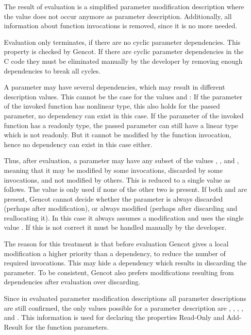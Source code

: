 The result of evaluation is a simplified parameter modification description where the value  does not 
occur anymore as parameter description. Additionally, all information about function invocations is removed, since it is
no more needed.

Evaluation only terminates, if there are no cyclic parameter dependencies. This property is checked by Gencot. If there
are cyclic parameter dependencies in the C code they must be eliminated manually by the developer by removing enough dependencies 
to break all cycles.

A parameter may have several dependencies, which may result in different description values. This cannot be the case for
the values  and : If the parameter of the invoked function has nonlinear type, this
also holds for the passed parameter, no dependency can exist in this case. If the parameter of the invoked function has
a readonly type, the passed parameter can still have a linear type which is not readonly. But it cannot be modified by the
function invocation, hence no dependency can exist in this case either.

Thus, after evaluation, a parameter may have any subset of the values , , and , meaning 
that it may be modified by some invocations, discarded by some invocations, and not modified by others. This is reduced to
a single value as follows. The value  is only used if none of the other two is present. If both 
and  are present, Gencot cannot decide whether the parameter is always discarded (perhaps after modification),
or always modified (perhaps after discarding and reallocating it). In this case it always assumes a modification and
uses the single value . If this is not correct it must be handled manually by the developer.

The reason for this treatment is that before evaluation Gencot gives a local modification a higher priority than a dependency,
to reduce the number of required invocations. This may hide a dependency which results in discarding the parameter. To
be consistent, Gencot also prefers modifications resulting from dependencies after evaluation over discarding. 

Since in evaluated parameter modification descriptions all parameter descriptions are still confirmed, the only values
possible for a parameter description are , , , , and .
This information is used for declaring the properties Read-Only and Add-Result for the function parameters.

